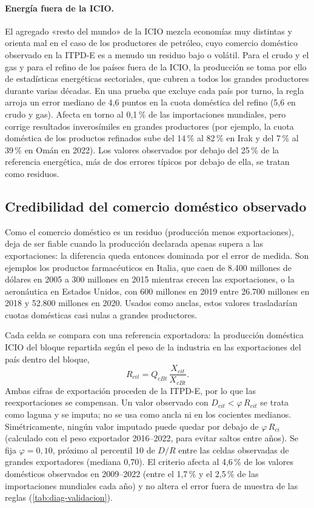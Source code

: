 \documentclass[final,1p,times,authoryear]{elsarticle}
\begin{document}
\paragraph{Energía fuera de la ICIO.} El agregado «resto del mundo» de la ICIO mezcla economías muy distintas y orienta mal en el caso de los productores de petróleo, cuyo comercio doméstico observado en la ITPD-E es a menudo un residuo bajo o volátil. Para el crudo y el gas y para el refino de los países fuera de la ICIO, la producción se toma por ello de estadísticas energéticas sectoriales, que cubren a todos los grandes productores durante varias décadas. En una prueba que excluye cada país por turno, la regla arroja un error mediano de 4,6 puntos en la cuota doméstica del refino (5,6 en crudo y gas). Afecta en torno al 0,1\,\% de las importaciones mundiales, pero corrige resultados inverosímiles en grandes productores (por ejemplo, la cuota doméstica de los productos refinados sube del 14\,\% al 82\,\% en Irak y del 7\,\% al 39\,\% en Omán en 2022). Los valores observados por debajo del 25\,\% de la referencia energética, más de dos errores típicos por debajo de ella, se tratan como residuos.

\subsection{Credibilidad del comercio doméstico observado}\label{subsec:credibilidad}
Como el comercio doméstico es un residuo (producción menos exportaciones), deja de ser fiable cuando la producción declarada apenas supera a las exportaciones: la diferencia queda entonces dominada por el error de medida. Son ejemplos los productos farmacéuticos en Italia, que caen de 8.400 millones de dólares en 2005 a 300 millones en 2015 mientras crecen las exportaciones, o la aeronáutica en Estados Unidos, con 600 millones en 2019 entre 26.700 millones en 2018 y 52.800 millones en 2020. Usados como anclas, estos valores trasladarían cuotas domésticas casi nulas a grandes productores.

Cada celda se compara con una referencia exportadora: la producción doméstica ICIO del bloque repartida según el peso de la industria en las exportaciones del país dentro del bloque,
\begin{equation}
R_{cit} = Q_{cBt}\,\frac{X_{cit}}{X_{cBt}}.
\end{equation}
Ambas cifras de exportación proceden de la ITPD-E, por lo que las reexportaciones se compensan. Un valor observado con $D_{cit} < \varphi\, R_{cit}$ se trata como laguna y se imputa; no se usa como ancla ni en los cocientes medianos. Simétricamente, ningún valor imputado puede quedar por debajo de $\varphi\, R_{ci}$ (calculado con el peso exportador 2016--2022, para evitar saltos entre años). Se fija $\varphi = 0{,}10$, próximo al percentil 10 de $D/R$ entre las celdas observadas de grandes exportadores (mediana 0,70). El criterio afecta al 4,6\,\% de los valores domésticos observados en 2009--2022 (entre el 1,7\,\% y el 2,5\,\% de las importaciones mundiales cada año) y no altera el error fuera de muestra de las reglas (\cref{tab:diag-validacion}).
\end{document}
